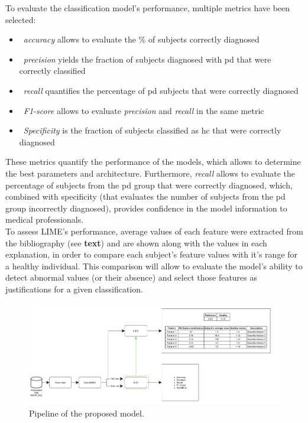 To evaluate the classification model's performance, multiple metrics have been selected:

\begin{itemize}
	\item ~\textit{accuracy} allows to evaluate the \% of subjects correctly diagnosed
	\item ~\textit{precision}  yields the fraction of subjects diagnosed with \gls{pd} that were correctly classified
	\item ~\textit{recall} quantifies the percentage of \gls{pd} subjects that were correctly diagnosed
	\item ~\textit{F1-score} allows to evaluate \textit{precision} and \textit{recall} in the same metric
	\item ~\textit{Specificity} is the fraction of subjects classified as \gls{hc} that were correctly diagnosed
\end{itemize}

These metrics quantify the performance of the models, which allows to determine the best parameters and architecture. Furthermore, \textit{recall} allows to evaluate the percentage of subjects from the \gls{pd} group that were correctly diagnosed, which, combined with specificity (that evaluates the number of subjects from the \gls{pd} group incorrectly diagnosed), provides confidence in the model information to medical professionals.
\\
To assess LIME's performance, average values of each feature were extracted from the bibliography (see \textbf{text}) and are shown along with the values in each explanation, in order to compare each subject's feature values with it's range for a healthy individual. This comparison will allow to evaluate the model's ability to detect abnormal values (or their absence) and select those features as justifications for a given classification.

\begin{figure}[t]
	\begin{center}
		\includegraphics[clip=true, width=\textwidth]{figs/pipeline.png}
	\end{center}
	\caption{Pipeline of the proposed model.}
	\label{pipeline}
\end{figure}

\pagebreak